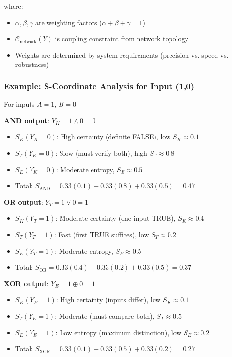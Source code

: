 \documentclass[11pt,a4paper]{article}
\begin{document}
where:
\begin{itemize}
\item $\alpha, \beta, \gamma$ are weighting factors ($\alpha + \beta + \gamma = 1$)
\item $\mathcal{C}_{\text{network}}(Y)$ is coupling constraint from network topology
\item Weights are determined by system requirements (precision vs. speed vs. robustness)
\end{itemize}

\subsubsection{Example: S-Coordinate Analysis for Input (1,0)}

For inputs $A=1$, $B=0$:

\textbf{AND output}: $Y_K = 1 \land 0 = 0$
\begin{itemize}
\item $S_K(Y_K=0)$: High certainty (definite FALSE), low $S_K \approx 0.1$
\item $S_T(Y_K=0)$: Slow (must verify both), high $S_T \approx 0.8$
\item $S_E(Y_K=0)$: Moderate entropy, $S_E \approx 0.5$
\item Total: $S_{\text{AND}} = 0.33(0.1) + 0.33(0.8) + 0.33(0.5) = 0.47$
\end{itemize}

\textbf{OR output}: $Y_T = 1 \lor 0 = 1$
\begin{itemize}
\item $S_K(Y_T=1)$: Moderate certainty (one input TRUE), $S_K \approx 0.4$
\item $S_T(Y_T=1)$: Fast (first TRUE suffices), low $S_T \approx 0.2$
\item $S_E(Y_T=1)$: Moderate entropy, $S_E \approx 0.5$
\item Total: $S_{\text{OR}} = 0.33(0.4) + 0.33(0.2) + 0.33(0.5) = 0.37$
\end{itemize}

\textbf{XOR output}: $Y_E = 1 \oplus 0 = 1$
\begin{itemize}
\item $S_K(Y_E=1)$: High certainty (inputs differ), low $S_K \approx 0.1$
\item $S_T(Y_E=1)$: Moderate (must compare both), $S_T \approx 0.5$
\item $S_E(Y_E=1)$: Low entropy (maximum distinction), low $S_E \approx 0.2$
\item Total: $S_{\text{XOR}} = 0.33(0.1) + 0.33(0.5) + 0.33(0.2) = 0.27$
\end{itemize}
\end{document}
